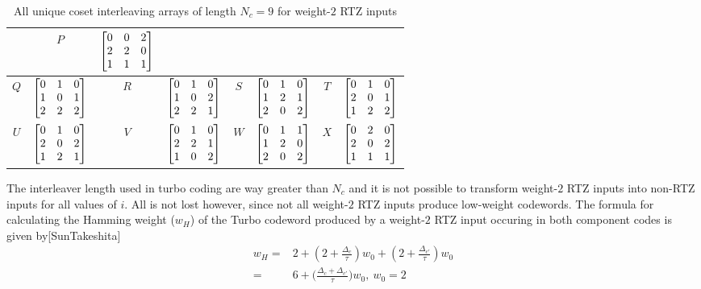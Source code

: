 \documentclass[11pt, oneside, dvipdfmx]{book}
\begin{document}
\begin{table}[h!]
\begin{tabular}{|c || c | c|| c|c || c | c|| c|}
&
 $P$ & $\begin{bmatrix}0 & 0 & 2 \cr 2 & 2 & 0 \cr 1 & 1 & 1\end{bmatrix}$\\ 
 \hline
 $Q$ & $\begin{bmatrix}0 & 1 & 0 \cr 1 & 0 & 1 \cr 2 & 2 & 2 \end{bmatrix}$
&
  $R$ & $\begin{bmatrix}0 & 1 & 0 \cr 1 & 0 & 2 \cr 2 & 2 & 1\end{bmatrix}$ 
&
 $S$ & $\begin{bmatrix}0 & 1 & 0 \cr 1 & 2 & 1 \cr 2 & 0 & 2 \end{bmatrix}$
 &
 $T$ & $\begin{bmatrix}0 & 1 & 0 \cr 2 & 0 & 1 \cr 1 & 2 & 2\end{bmatrix}$\\ 
 \hline
 $U$ & $\begin{bmatrix}0 & 1 & 0 \cr 2 & 0 & 2 \cr 1 & 2 & 1\end{bmatrix}$ 
 &
 $V$ & $\begin{bmatrix}0 & 1 & 0 \cr 2 & 2 & 1 \cr 1 & 0 & 2\end{bmatrix}$ 
 &
 $W$ & $\begin{bmatrix}0 & 1 & 1 \cr 1 & 2 & 0 \cr 2 & 0 & 2 \end{bmatrix}$
 &
 $X$ & $\begin{bmatrix}0 & 2 & 0 \cr 2 & 0 & 2 \cr 1 & 1 & 1\end{bmatrix}$\\ 
   \hline

  \end{tabular}
\caption{All unique coset interleaving arrays of length $N_c =9$ for weight-$2$ RTZ inputs}
\label{tb1}
\end{table}

The interleaver length used in turbo coding are way greater than $N_c$ and it is not possible to transform weight-$2$ RTZ inputs into non-RTZ inputs for all values of $i$. All is not lost however, since not all weight-$2$ RTZ inputs produce low-weight codewords. 
The formula for calculating the Hamming weight ($w_H$) of the Turbo codeword produced by a weight-$2$ RTZ input occuring in both component codes is given by[SunTakeshita] 
\begin{equation}
\begin{split}
w_H=&2+(2 + \frac{\Delta_c}{\tau} )w_0+ (2 + \frac{\Delta_{c'}}{\tau})w_0\\
=&6+\Big(\frac{\Delta_c+\Delta_{c'}}{\tau}\Big)w_0,~w_0=2
\end{split}
\label{eq3}
\end{equation}
\end{document}
